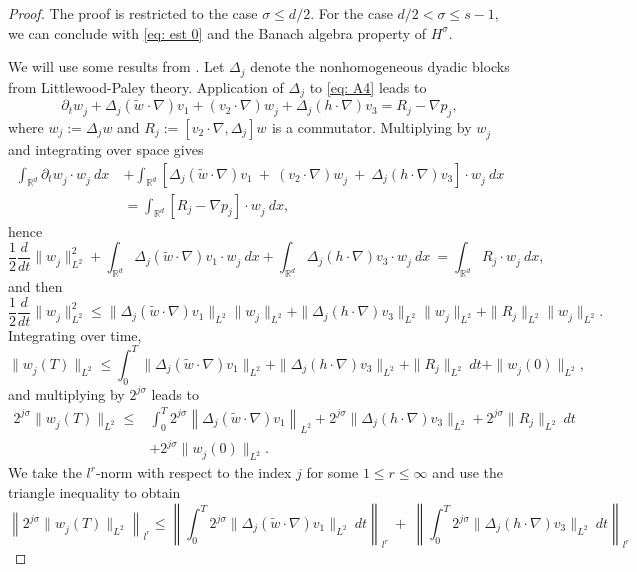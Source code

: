 \documentclass{amsart}
\begin{document}
\begin{proof}
The proof is restricted to the case $\sigma\leq d/2 $. For the case $d/2<\sigma \leq s-1$, we can conclude with \eqref{eq: est 0} and the Banach algebra property of $H^{\sigma}$.

We will use some results from \cite[Chapter 2]{Bahouri.2011}. Let $\Delta_j$ denote the nonhomogeneous dyadic blocks from Littlewood-Paley theory. Application of $\Delta_j$ to \eqref{eq: A4} leads to
$$ \partial_t w^{}_j + \Delta_j (\tilde{w}^{} \cdot \nabla) v_1 +  (v_2 \cdot \nabla) w^{}_j + \Delta_j(h\cdot \nabla) v_3 =  R_j - \nabla p_j,$$
where $w_j:=\Delta_jw$ and $R_j:=[v_2\cdot \nabla,\Delta_j] w^{}$ is a commutator. Multiplying by $w^{}_j$ and integrating over space gives
\begin{align*}
    \int_{\mathbb{R}^d} \partial_t w^{}_j \cdot w^{}_j \ dx \ &+ \int_{\mathbb{R}^d} \left[\Delta_j (\tilde{w} \cdot \nabla) v_1 \ + \ (v_2\cdot \nabla) w^{}_j \ + \ \Delta_j(h\cdot \nabla) v_3 \right] \cdot w^{}_j \ dx \\
    &=  \int_{\mathbb{R}^d} \left[R_j -\nabla p_j\right] \cdot w^{}_j \ dx,
\end{align*} 
hence
$$ \frac{1}{2} \frac{d}{dt} \|w^{}_j\|_{L^2}^2 + \int_{\mathbb{R}^d} \Delta_j (\tilde{w} \cdot \nabla) v_1 \cdot w^{}_j\ dx  + \int_{\mathbb{R}^d}\Delta_j(h\cdot \nabla) v_3 \cdot w^{}_j \ dx \ =  \int_{\mathbb{R}^d} R_j \cdot w^{}_j \ dx, $$
and then
$$ \frac{1}{2} \frac{d}{dt} \|w^{}_j\|_{L^2}^2 \leq  \|\Delta_j (\tilde{w} \cdot \nabla) v_1\|_{L^2} \|w^{}_j\|_{L^2}+ \|\Delta_j(h \cdot \nabla) v_3 \|_{L^2} \|w^{}_j\|_{L^2} + \|R_j\|_{L^2} \|w^{}_j\|_{L^2}. $$
Integrating over time,
$$  \|w^{}_j(T)\|_{L^2} \leq  \int_0^T \|\Delta_j (\tilde{w} \cdot \nabla) v_1\|_{L^2} + \|\Delta_j(h\cdot \nabla) v_3 \|_{L^2}  + \|R_j\|_{L^2} \ dt + \|w^{}_j(0)\|_{L^2},$$
and multiplying by $2^{j\sigma}$ leads to
\begin{align*}
    2^{j\sigma}\|w^{}_j(T)\|_{L^2} \leq & \int_0^T 2^{j\sigma}\left\|\Delta_j (\tilde{w}\cdot \nabla) v_1\right\|_{L^2} + 2^{j\sigma}\|\Delta_j(h\cdot \nabla) v_3\|_{L^2}   + 2^{j\sigma}\|R_j\|_{L^2} \ dt\\
    &+ 2^{j\sigma}\|w^{}_j(0)\|_{L^2}.
\end{align*} 
We take the $\textit{l}^r$-norm with respect to the index $j$ for some $1\leq r  \leq \infty$ and use the triangle inequality to obtain
$$  \left\|2^{j\sigma}\|w^{}_j(T)\|_{L^2}\right\|_{\textit{l}^r} \leq  \left\|\int_0^T 2^{j\sigma}\|\Delta_j (\tilde{w} \cdot \nabla) v_1\|_{L^2}  \ dt\right\|_{\textit{l}^r} \ + \ \left\|\int_0^T 2^{j\sigma}\|\Delta_j(h\cdot \nabla) v_3\|_{L^2}  \ dt\right\|_{\textit{l}^r} $$ 

\end{proof}
\end{document}
